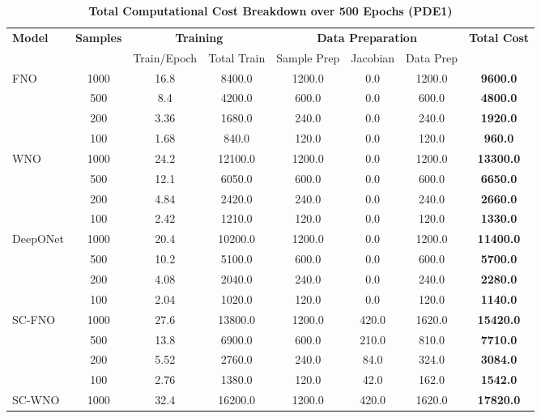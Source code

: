 \begin{table}[htbp]
\centering
\caption{\scriptsize\textbf{Total Computational Cost Breakdown over 500 Epochs (PDE1)}}
\label{tab:PDE1_total_computational_cost}
\scriptsize
\setlength{\tabcolsep}{3pt}
\begin{tabular}{l|c|cc|ccc|c}
\hline
\textbf{Model} & \textbf{Samples} & \multicolumn{2}{c|}{\textbf{Training}} & \multicolumn{3}{c|}{\textbf{Data Preparation}} & \textbf{Total Cost} \\
& & Train/Epoch & Total Train & Sample Prep & Jacobian & Data Prep &  \\
\hline
FNO & 1000 & 16.8 & 8400.0 & 1200.0 & 0.0 & 1200.0 & \textbf{9600.0} \\
    & 500  & 8.4  & 4200.0 & 600.0  & 0.0 & 600.0  & \textbf{4800.0} \\
    & 200  & 3.36 & 1680.0 & 240.0  & 0.0 & 240.0  & \textbf{1920.0} \\
    & 100  & 1.68 & 840.0  & 120.0  & 0.0 & 120.0  & \textbf{960.0} \\
\hline
WNO & 1000 & 24.2 & 12100.0 & 1200.0 & 0.0 & 1200.0 & \textbf{13300.0} \\
    & 500  & 12.1 & 6050.0  & 600.0  & 0.0 & 600.0  & \textbf{6650.0} \\
    & 200  & 4.84 & 2420.0  & 240.0  & 0.0 & 240.0  & \textbf{2660.0} \\
    & 100  & 2.42 & 1210.0  & 120.0  & 0.0 & 120.0  & \textbf{1330.0} \\
\hline
DeepONet & 1000 & 20.4 & 10200.0 & 1200.0 & 0.0 & 1200.0 & \textbf{11400.0} \\
         & 500  & 10.2 & 5100.0  & 600.0  & 0.0 & 600.0  & \textbf{5700.0} \\
         & 200  & 4.08 & 2040.0  & 240.0  & 0.0 & 240.0  & \textbf{2280.0} \\
         & 100  & 2.04 & 1020.0  & 120.0  & 0.0 & 120.0  & \textbf{1140.0} \\
\hline
SC-FNO & 1000 & 27.6 & 13800.0 & 1200.0 & 420.0 & 1620.0 & \textbf{15420.0} \\
       & 500  & 13.8 & 6900.0  & 600.0  & 210.0 & 810.0  & \textbf{7710.0} \\
       & 200  & 5.52 & 2760.0  & 240.0  & 84.0  & 324.0  & \textbf{3084.0} \\
       & 100  & 2.76 & 1380.0  & 120.0  & 42.0  & 162.0  & \textbf{1542.0} \\
\hline
SC-WNO & 1000 & 32.4 & 16200.0 & 1200.0 & 420.0 & 1620.0 & \textbf{17820.0} \\

\end{tabular}
\end{table}
